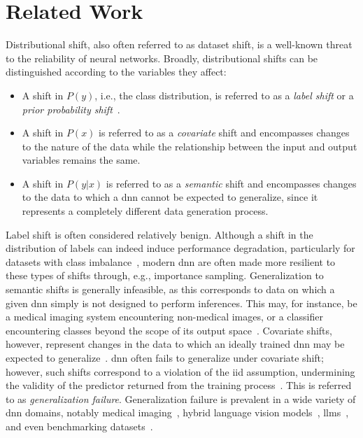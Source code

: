 \documentclass[10pt,twocolumn,letterpaper]{article}
\begin{document}
\section{Related Work}\label{sec:related_work}
Distributional shift, also often referred to as dataset shift, is a well-known threat to the reliability of neural networks\cite{unifyingdatashift}. Broadly, distributional shifts can be distinguished according to the variables they affect:
\begin{itemize}
    \item A shift in \(P(y)\), i.e., the class distribution, is referred to as a \textit{label shift} or a \textit{prior probability shift}~\cite{unifyingdatashift}.
    \item A shift in \(P(x)\) is referred to as a \textit{covariate} shift and encompasses changes to the nature of the data while the relationship between the input and output variables remains the same. 
    \item A shift in \(P(y|x)\) is referred to as a \textit{semantic} shift and encompasses changes to the data to which a \gls{dnn} cannot be expected to generalize, since it represents a completely different data generation process.
\end{itemize}
Label shift is often considered relatively benign. Although a shift in the distribution of labels can indeed induce performance degradation, particularly for datasets with class imbalance~\cite{class_imbalance}, modern \gls{dnn} are often made more resilient to these types of shifts through, e.g., importance sampling. Generalization to semantic shifts is generally infeasible, as this corresponds to data on which a given \gls{dnn} simply is not designed to perform inferences. This may, for instance, be a medical imaging system encountering non-medical images, or a classifier encountering classes beyond the scope of its output space~\cite{dsd_survey}. Covariate shifts, however, represent changes in the data to which an ideally trained \gls{dnn} may be expected to generalize~\cite{ood_position, unifyingdatashift}. \Gls{dnn} often fails to generalize under covariate shift; however, such shifts correspond to a violation of the \gls{iid} assumption, undermining the validity of the predictor returned from the training process~\cite{vapnik_statistical_learning}. This is referred to as \textit{generalization failure}. Generalization failure is prevalent in a wide variety of \gls{dnn} domains, notably medical imaging~\cite{endocv2021_review, retinopathy, damour2020underspecification, shortcut_learning, skin_shortcut}, hybrid language vision models~\cite{clip_generalization}, \glspl{llm}~\cite{llm_genfailure, llm_hallucinations}, and even benchmarking datasets~\cite{imagenet_gen, cifar_gen}. 
\end{document}
